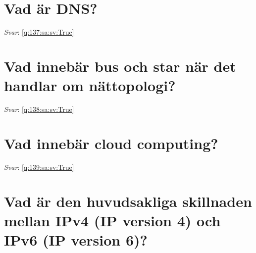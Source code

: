 \documentclass[a4paper,11pt,oneside]{book}
\begin{document}
\begin{sloppypar}
\section{Vad \"ar DNS?}

\label{q:137:sa:sv:False}

\vspace{2cm}

\noindent\makebox[\textwidth]{\hrulefill}

\vspace{1cm}

\textit{Svar}: \autoref{q:137:sa:sv:True}



\section{Vad inneb\"ar bus och star n\"ar det handlar om n\"attopologi?}

\label{q:138:sa:sv:False}

\vspace{2cm}

\noindent\makebox[\textwidth]{\hrulefill}

\vspace{1cm}

\textit{Svar}: \autoref{q:138:sa:sv:True}



\section{Vad inneb\"ar cloud computing?}

\label{q:139:sa:sv:False}

\vspace{2cm}

\noindent\makebox[\textwidth]{\hrulefill}

\vspace{1cm}

\textit{Svar}: \autoref{q:139:sa:sv:True}



\section{Vad \"ar den huvudsakliga skillnaden mellan IPv4 (IP version 4) och IPv6 (IP version 6)?}

\label{q:140:sa:sv:False}

\vspace{2cm}

\noindent\makebox[\textwidth]{\hrulefill}


\end{sloppypar}
\end{document}
